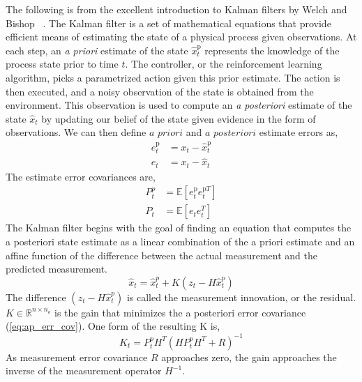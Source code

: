 \documentclass{article}
\begin{document}
The following is from the excellent introduction to Kalman filters by Welch and Bishop ~\cite{welchBishop}. The Kalman filter is a set of mathematical equations that provide efficient means of estimating the state of a physical process given observations. At each step, an \textit{a priori} estimate of the state $\hat{x}_{t}^{\text{p}}$ represents the knowledge of the process state prior to time $t$. The controller, or the reinforcement learning algorithm, picks a parametrized action given this prior estimate. The action is then executed, and a noisy observation of the state is obtained from the environment. This observation is used to compute an \textit{a posteriori} estimate of the state $\hat{x}_{t}$ by updating our belief of the state given evidence in the form of observations. We can then define $\textit{a priori}$ and $\textit{a posteriori}$ estimate errors as,
\begin{align*}
	e^{\text{p}}_t &= x_t - \hat{x}_{t}^{\text{p}} \\
	e_t &= x_t - \hat{x}_{t} 
\end{align*}
The estimate error covariances are,
\begin{align}
	P^p_t &= \mathbb{E}\left[e^{\text{p}}_t e^{\text{p}T}_t \right]  \\
	P_t &= \mathbb{E}\left[e_t e_t^{T} \right] \label{eq:ap_err_cov}
\end{align}
The Kalman filter begins with the goal of finding an equation that computes the a posteriori state estimate as a linear combination of the a priori estimate and an affine function of the difference between the actual measurement and the predicted measurement.
\begin{equation}
	\hat{x}_t = \hat{x}_t^p + K(z_t - H\hat{x}_t^p)
	\label{eq:ap}
\end{equation}
The difference $(z_t - H\hat{x}_t^p)$ is called the measurement innovation, or the residual.  $K \in \mathbb{R}^{n \times n_o}$ is the gain that minimizes the a posteriori error covariance (\ref{eq:ap_err_cov}). One form of the resulting K is, \cite{maybeck1982stochastic} 
\begin{equation}
	K_t = P_t^p H^T(HP_t^pH^T + R)^{-1}
	\label{eq:k_gain}
\end{equation}
As measurement error covariance $R$ approaches zero, the gain approaches the inverse of the measurement operator $H^{-1}$. 
\end{document}
